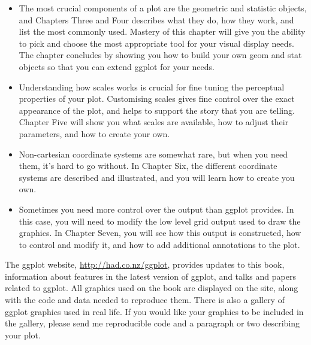 \begin{itemize}
	\item The most crucial components of a plot are the geometric and statistic objects, and Chapters Three and Four describes what they do, how they work, and list the most commonly used.  Mastery of this chapter will give you the ability to pick and choose the most appropriate tool for your visual display needs.  The chapter concludes by showing you how to build your own geom and stat objects so that you can extend ggplot for your needs.

	\item Understanding how scales works is crucial for fine tuning the perceptual properties of your plot.  Customising scales gives fine control over the exact appearance of the plot, and helps to support the story that you are telling.  Chapter Five will show you what scales are available, how to adjust their parameters, and how to create your own.

	\item Non-cartesian coordinate systems are somewhat rare, but when you need them, it's hard to go without.  In Chapter Six, the different coordinate systems are described and illustrated, and you will learn how to create you own.
	
	
	\item Sometimes you need more control over the output than ggplot provides.  In this case, you will need to modify the low level grid output used to draw the graphics.  In Chapter Seven, you will see how this output is constructed, how to control and modify it, and how to add additional annotations to the plot.

\end{itemize}

The ggplot website, \url{http://had.co.nz/ggplot}, provides updates to this book, information about features in the latest version of ggplot, and talks and papers related to ggplot.  All graphics used on the book are displayed on the site, along with the code and data needed to reproduce them.  There is also a gallery of ggplot graphics used in real life.  If you would like your graphics to be included in the gallery, please send me reproducible code and a paragraph or two describing your plot.


